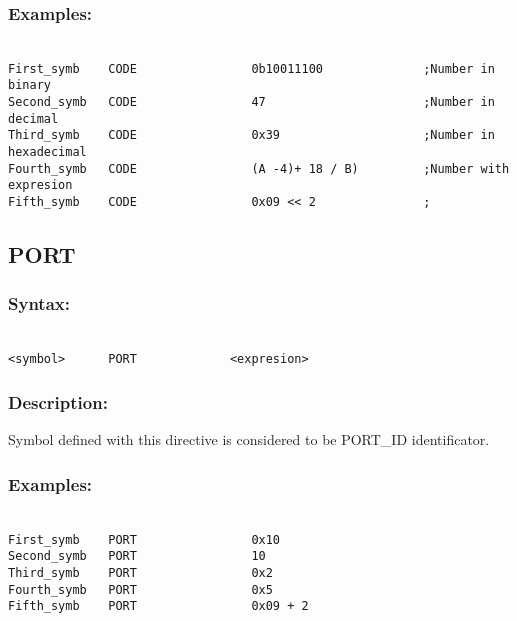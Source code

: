         \subsubsection{Examples:}
            {
                ~\\
                \usecodefont
                \verb'First_symb    CODE                0b10011100              ;Number in binary'\\
                \verb'Second_symb   CODE                47                      ;Number in decimal'\\
                \verb'Third_symb    CODE                0x39                    ;Number in hexadecimal'\\
                \verb'Fourth_symb   CODE                (A -4)+ 18 / B)         ;Number with expresion'\\
                \verb'Fifth_symb    CODE                0x09 << 2               ;'\\
            }
            
    \subsection{PORT}
        \subsubsection{Syntax:}
            {
                ~\\
                \usecodefont        
            \verb'<symbol>      PORT             <expresion>'
            }
        \subsubsection{Description:}
        Symbol defined with this directive is considered to be PORT\_ID identificator.

        \subsubsection{Examples:}
            {
                ~\\
                \usecodefont
                \verb'First_symb    PORT                0x10    '\\
                \verb'Second_symb   PORT                10      '\\
                \verb'Third_symb    PORT                0x2     '\\
                \verb'Fourth_symb   PORT                0x5     '\\
                \verb'Fifth_symb    PORT                0x09 + 2'\\
            }
